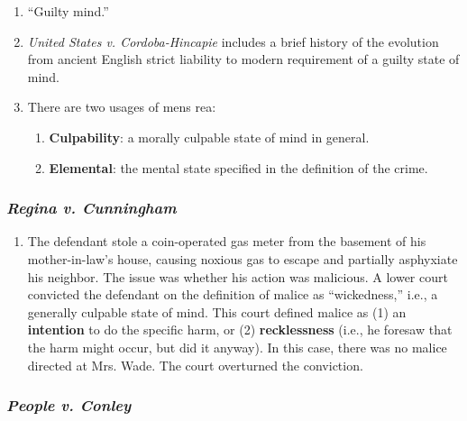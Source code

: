 \begin{enumerate}
    \item ``Guilty mind.''
    \item \emph{United States v. Cordoba-Hincapie} includes a brief history of the evolution from ancient English strict liability to modern requirement of a guilty state of mind.
    \item There are two usages of mens rea:
    \begin{enumerate}
        \item \textbf{Culpability}: a morally culpable state of mind in general.
        \item \textbf{Elemental}: the mental state specified in the definition of the crime.
    \end{enumerate}
\end{enumerate}

\subsubsection{\emph{Regina v. Cunningham}}

\begin{enumerate}
    \item The defendant stole a coin-operated gas meter from the basement of his mother-in-law's house, causing noxious gas to escape and partially asphyxiate his neighbor. The issue was whether his action was malicious. A lower court convicted the defendant on the definition of malice as ``wickedness,'' i.e., a generally culpable state of mind. This court defined malice as (1) an \textbf{intention} to do the specific harm, or (2) \textbf{recklessness} (i.e., he foresaw that the harm might occur, but did it anyway). In this case, there was no malice directed at Mrs. Wade. The court overturned the conviction.
\end{enumerate}

\subsubsection{\emph{People v. Conley}}

